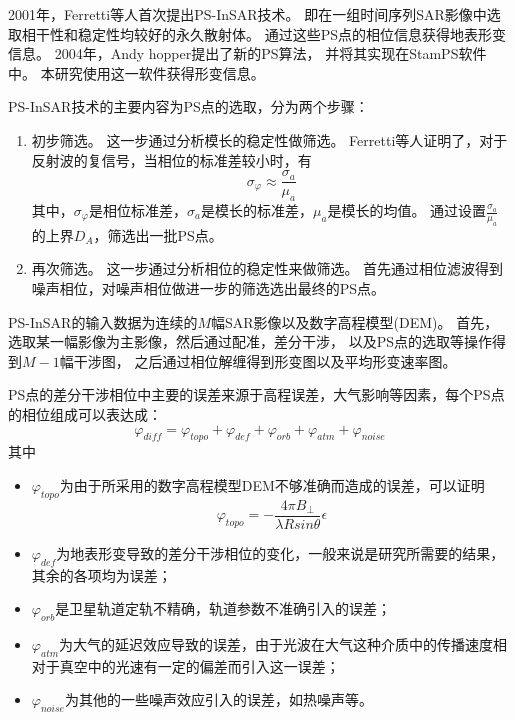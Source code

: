 2001年，Ferretti等人首次提出PS-InSAR\cite{ferrettiNonlinearSubsidenceRate2000}技术。
即在一组时间序列SAR影像中选取相干性和稳定性均较好的永久散射体。
通过这些PS点的相位信息获得地表形变信息。
2004年，Andy hopper提出了新的PS算法\cite{hooperNewMethodMeasuring2004}，
并将其实现在StamPS软件中\cite{hooperRecentAdvancesSAR2012}。
本研究使用这一软件获得形变信息。

PS-InSAR技术的主要内容为PS点的选取，分为两个步骤：
\begin{enumerate}
    \item 初步筛选。
    这一步通过分析模长的稳定性做筛选。
    Ferretti等人证明了，对于反射波的复信号，当相位的标准差较小时，有
    \begin{equation}
        \sigma_\varphi \approx \frac{\sigma_a}{\mu_a}
    \end{equation}
    其中，$\sigma_\varphi$是相位标准差，$\sigma_a$是模长的标准差，$\mu_a$是模长的均值。
    通过设置$\frac{\sigma_a}{\mu_a}$的上界$D_A$，筛选出一批PS点。
    \item 再次筛选。
    这一步通过分析相位的稳定性来做筛选。
    首先通过相位滤波得到噪声相位，对噪声相位做进一步的筛选选出最终的PS点。
\end{enumerate}

PS-InSAR的输入数据为连续的$M$幅SAR影像以及数字高程模型(DEM)。
首先，选取某一幅影像为主影像，然后通过配准，差分干涉，
以及PS点的选取等操作得到$M-1$幅干涉图，
之后通过相位解缠得到形变图以及平均形变速率图。

PS点的差分干涉相位中主要的误差来源于高程误差，大气影响等因素，每个PS点的相位组成可以表达成：
\begin{equation}
    \varphi_{diff}=\varphi_{topo}+\varphi_{def}+\varphi_{orb}+\varphi_{atm}+\varphi_{noise}
\end{equation}
其中
\begin{itemize}
    \item $\varphi_{topo}$为由于所采用的数字高程模型DEM不够准确而造成的误差，可以证明
    \begin{equation}
        \varphi_{topo}=-\frac{4\pi B_{\bot}}{\lambda R sin \theta}\epsilon
    \end{equation}
    \item $\varphi_{def}$为地表形变导致的差分干涉相位的变化，一般来说是研究所需要的结果，其余的各项均为误差；
    \item $\varphi_{orb}$是卫星轨道定轨不精确，轨道参数不准确引入的误差；
    \item $\varphi_{atm}$为大气的延迟效应导致的误差，由于光波在大气这种介质中的传播速度相对于真空中的光速有一定的偏差而引入这一误差；
    \item $\varphi_{noise}$为其他的一些噪声效应引入的误差，如热噪声等。
\end{itemize}

